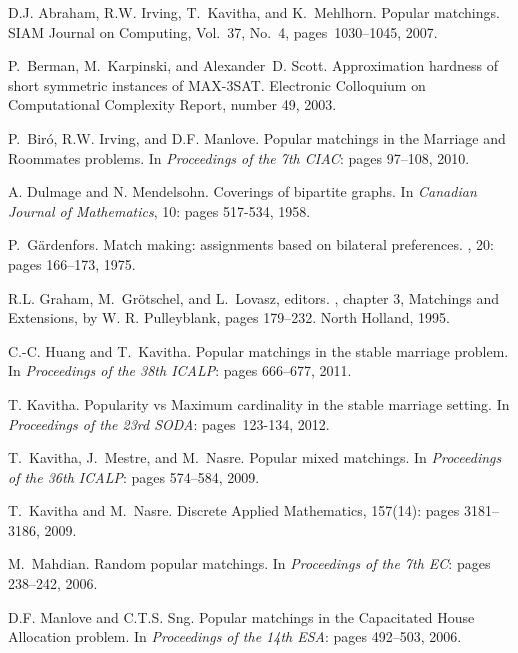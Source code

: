 \documentclass[11pt]{llncs}
\begin{document}

\begin{thebibliography}{10}


D.J. Abraham, R.W. Irving, T.~Kavitha, and K.~Mehlhorn.
\newblock Popular matchings.
\newblock SIAM Journal on Computing, Vol.~37, No.~4, pages~1030--1045, 2007.

P.~Berman, M.~Karpinski, and Alexander~D. Scott.
\newblock Approximation hardness of short symmetric instances of {MAX-3SAT}.
\newblock Electronic Colloquium on Computational Complexity Report, number 49,
  2003.

P.~Bir\'o, R.W. Irving, and D.F. Manlove.
\newblock Popular matchings in the {M}arriage and {R}oommates problems.
\newblock In {\em Proceedings of the 7th CIAC}: pages 97--108, 2010.

A. Dulmage and N. Mendelsohn. 
Coverings of bipartite graphs. 
In {\em Canadian Journal of Mathematics}, 10: pages 517-534, 1958. 

P.~G\"{a}rdenfors.
\newblock Match making: assignments based on bilateral preferences.
, 20: pages 166--173, 1975.

R.L. Graham, M.~Gr\"{o}tschel, and L.~Lovasz, editors.
, chapter 3, Matchings and
  Extensions, by W. R. Pulleyblank, pages 179--232.
\newblock North Holland, 1995.

C.-C. Huang and T.~Kavitha.
\newblock Popular matchings in the stable marriage problem.
\newblock In {\em Proceedings of the 38th ICALP}: pages 666--677, 2011.

T. Kavitha.
\newblock Popularity vs Maximum cardinality in the stable marriage setting.
\newblock  In {\em Proceedings of the 23rd SODA}: pages~123-134, 2012.

T.~Kavitha, J.~Mestre, and M.~Nasre.
\newblock Popular mixed matchings.
\newblock In {\em Proceedings of the 36th ICALP}: pages 574--584, 2009.

T.~Kavitha and M.~Nasre.
\newblock Discrete Applied Mathematics, 157(14): pages 3181--3186, 2009.

M.~Mahdian.
\newblock Random popular matchings.
\newblock In {\em Proceedings of the 7th EC}: pages 238--242, 2006.

D.F. Manlove and C.T.S. Sng.
\newblock Popular matchings in the {C}apacitated {H}ouse {A}llocation problem.
\newblock In {\em Proceedings of the 14th ESA}: pages 492--503, 2006.


\end{thebibliography}
\end{document}
